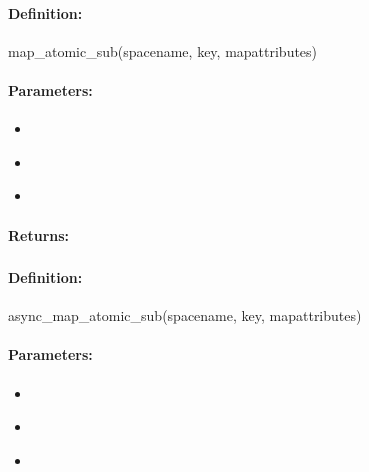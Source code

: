 \paragraph{Definition:}
\begin{rubycode}
map_atomic_sub(spacename, key, mapattributes)
\end{rubycode}

\paragraph{Parameters:}
\begin{itemize}[noitemsep]
\item {}\\

\item {}\\

\item {}\\

\end{itemize}

\paragraph{Returns:}


\pagebreak
\subsubsection{}
\label{api:ruby:async_map_atomic_sub}


\paragraph{Definition:}
\begin{rubycode}
async_map_atomic_sub(spacename, key, mapattributes)
\end{rubycode}

\paragraph{Parameters:}
\begin{itemize}[noitemsep]
\item {}\\

\item {}\\

\item {}\\

\end{itemize}

